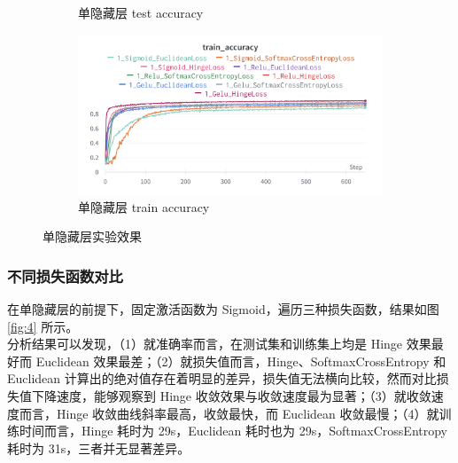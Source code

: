 \documentclass{article}
\begin{document}
\begin{figure}[htbp]
\begin{subfigure}{0.475\textwidth}
		\caption{单隐藏层 test accuracy}
	\end{subfigure}
	\begin{subfigure}{0.475\textwidth}
		\centering
		\includegraphics[width=1\textwidth]{../pics/单层实验-train_acc.png}
		\caption{单隐藏层 train accuracy}
	\end{subfigure}
	\caption{单隐藏层实验效果}
	\label{fig:3}
\end{figure}

\subsubsection{不同损失函数对比}

在单隐藏层的前提下，固定激活函数为 Sigmoid，遍历三种损失函数，结果如图 \ref{fig:4} 所示。\\
分析结果可以发现，（1）就准确率而言，在测试集和训练集上均是 Hinge 效果最好而 Euclidean 效果最差；（2）就损失值而言，Hinge、SoftmaxCrossEntropy 和 Euclidean 计算出的绝对值存在着明显的差异，损失值无法横向比较，然而对比损失值下降速度，能够观察到 Hinge 收敛效果与收敛速度最为显著；（3）就收敛速度而言，Hinge 收敛曲线斜率最高，收敛最快，而 Euclidean 收敛最慢；（4）就训练时间而言，Hinge 耗时为 
29s，Euclidean 耗时也为 29s，SoftmaxCrossEntropy 耗时为 31s，三者并无显著差异。
\end{document}
